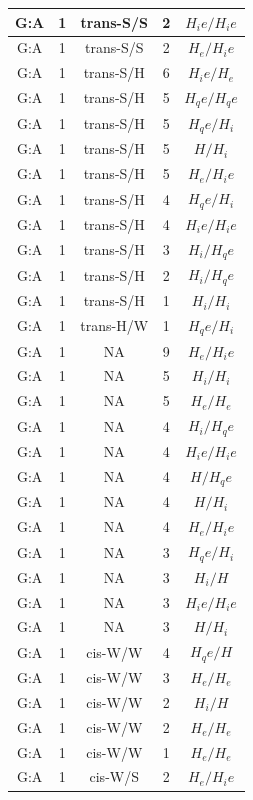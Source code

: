 \begin{center}
\begin{longtable}{c|c|c|c|c}
G:A & 1 & trans-S/S & 2 & $H_ie/H_ie$ \\  \hline
G:A & 1 & trans-S/S & 2 & $H_e/H_ie$ \\  \hline
G:A & 1 & trans-S/H & 6 & $H_ie/H_e$ \\  \hline
G:A & 1 & trans-S/H & 5 & $H_qe/H_qe$ \\  \hline
G:A & 1 & trans-S/H & 5 & $H_qe/H_i$ \\  \hline
G:A & 1 & trans-S/H & 5 & $H/H_i$ \\  \hline
G:A & 1 & trans-S/H & 5 & $H_e/H_ie$ \\  \hline
G:A & 1 & trans-S/H & 4 & $H_qe/H_i$ \\  \hline
G:A & 1 & trans-S/H & 4 & $H_ie/H_ie$ \\  \hline
G:A & 1 & trans-S/H & 3 & $H_i/H_qe$ \\  \hline
G:A & 1 & trans-S/H & 2 & $H_i/H_qe$ \\  \hline
G:A & 1 & trans-S/H & 1 & $H_i/H_i$ \\  \hline
G:A & 1 & trans-H/W & 1 & $H_qe/H_i$ \\  \hline
G:A & 1 & NA & 9 & $H_e/H_ie$ \\  \hline
G:A & 1 & NA & 5 & $H_i/H_i$ \\  \hline
G:A & 1 & NA & 5 & $H_e/H_e$ \\  \hline
G:A & 1 & NA & 4 & $H_i/H_qe$ \\  \hline
G:A & 1 & NA & 4 & $H_ie/H_ie$ \\  \hline
G:A & 1 & NA & 4 & $H/H_qe$ \\  \hline
G:A & 1 & NA & 4 & $H/H_i$ \\  \hline
G:A & 1 & NA & 4 & $H_e/H_ie$ \\  \hline
G:A & 1 & NA & 3 & $H_qe/H_i$ \\  \hline
G:A & 1 & NA & 3 & $H_i/H$ \\  \hline
G:A & 1 & NA & 3 & $H_ie/H_ie$ \\  \hline
G:A & 1 & NA & 3 & $H/H_i$ \\  \hline
G:A & 1 & cis-W/W & 4 & $H_qe/H$ \\  \hline
G:A & 1 & cis-W/W & 3 & $H_e/H_e$ \\  \hline
G:A & 1 & cis-W/W & 2 & $H_i/H$ \\  \hline
G:A & 1 & cis-W/W & 2 & $H_e/H_e$ \\  \hline
G:A & 1 & cis-W/W & 1 & $H_e/H_e$ \\  \hline
G:A & 1 & cis-W/S & 2 & $H_e/H_ie$ \\  \hline

\end{longtable}
\end{center}
